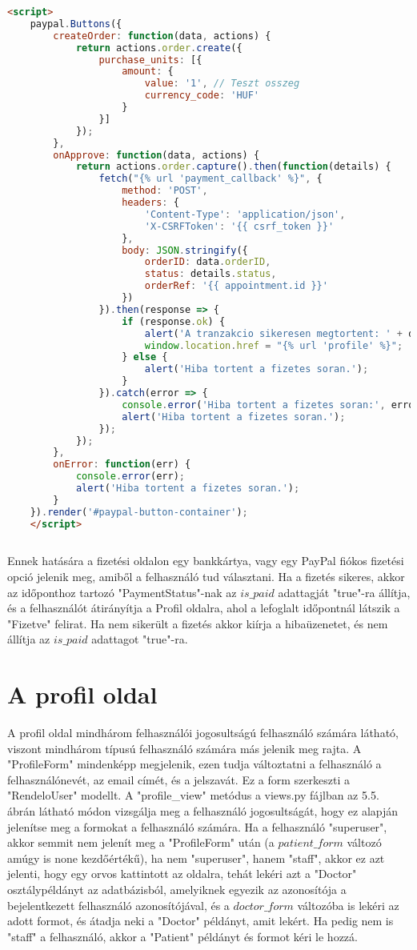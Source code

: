 \begin{lstlisting}[caption={A fizetési logika},label={lst:stringstartswith}, language={HTML}]
	<script>
	paypal.Buttons({
		createOrder: function(data, actions) {
			return actions.order.create({
				purchase_units: [{
					amount: {
						value: '1', // Teszt osszeg
						currency_code: 'HUF'
					}
				}]
			});
		},
		onApprove: function(data, actions) {
			return actions.order.capture().then(function(details) {
				fetch("{% url 'payment_callback' %}", {
					method: 'POST',
					headers: {
						'Content-Type': 'application/json',
						'X-CSRFToken': '{{ csrf_token }}'
					},
					body: JSON.stringify({
						orderID: data.orderID,
						status: details.status,
						orderRef: '{{ appointment.id }}'
					})
				}).then(response => {
					if (response.ok) {
						alert('A tranzakcio sikeresen megtortent: ' + details.payer.name.given_name);
						window.location.href = "{% url 'profile' %}";
					} else {
						alert('Hiba tortent a fizetes soran.');
					}
				}).catch(error => {
					console.error('Hiba tortent a fizetes soran:', error);
					alert('Hiba tortent a fizetes soran.');
				});
			});
		},
		onError: function(err) {
			console.error(err);
			alert('Hiba tortent a fizetes soran.');
		}
	}).render('#paypal-button-container');
	</script>
	
\end{lstlisting}

Ennek hatására a fizetési oldalon egy bankkártya, vagy egy PayPal fiókos fizetési opció jelenik meg, amiből a felhasználó tud választani. Ha a fizetés sikeres, akkor az időponthoz tartozó "PaymentStatus"-nak az $is\_paid$ adattagját "true"-ra állítja, és a felhasználót átirányítja a Profil oldalra, ahol a lefoglalt időpontnál látszik a "Fizetve" felirat. Ha nem sikerült a fizetés akkor kiírja a hibaüzenetet, és nem állítja az $is\_paid$ adattagot "true"-ra.

\section{A profil oldal}

A profil oldal mindhárom felhasználói jogosultságú felhasználó számára látható, viszont mindhárom típusú felhasználó számára más jelenik meg rajta. A "ProfileForm" mindenképp megjelenik, ezen tudja változtatni a felhasználó a felhasználónevét, az email címét, és a jelszavát. Ez a form szerkeszti a "RendeloUser" modellt. A "profile\_view" metódus a views.py fájlban az 5.5. ábrán látható módon vizsgálja meg a felhasználó jogosultságát, hogy ez alapján jelenítse meg a formokat a felhasználó számára. Ha a felhasználó "superuser", akkor semmit nem jelenít meg a "ProfileForm" után (a $patient\_form$ változó amúgy is none kezdőértékű), ha nem "superuser", hanem "staff", akkor ez azt jelenti, hogy egy orvos kattintott az oldalra, tehát lekéri azt a "Doctor" osztálypéldányt az adatbázisból, amelyiknek egyezik az azonosítója a bejelentkezett felhasználó azonosítójával, és a $doctor\_form$ változóba is lekéri az adott formot, és átadja neki a "Doctor" példányt, amit lekért. Ha pedig nem is "staff" a felhasználó, akkor a "Patient" példányt és formot kéri le hozzá.

